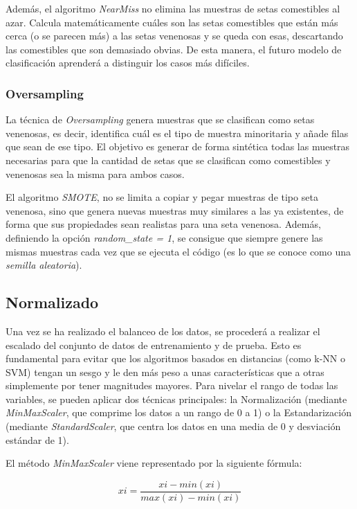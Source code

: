 \documentclass{Plantilla/Formato_EPEF}
\begin{document}
Además, el algoritmo \textit{NearMiss} no elimina las muestras de setas comestibles al azar. Calcula matemáticamente cuáles son las setas comestibles que están más cerca (o se parecen más) a las setas venenosas y se queda con esas, descartando las comestibles que son demasiado \textgravedbl obvias\textacutedbl. De esta manera, el futuro modelo de clasificación aprenderá a distinguir los casos más difíciles.



\subsubsection{Oversampling}

La técnica de \textit{Oversampling} genera muestras que se clasifican como setas venenosas, es decir, identifica cuál es el tipo de muestra minoritaria y añade filas que sean de ese tipo. El objetivo es generar de forma sintética todas las muestras necesarias para que la cantidad de setas que se clasifican como comestibles y venenosas sea la misma para ambos casos.

El algoritmo \textit{SMOTE}, no se limita a copiar y pegar muestras de tipo seta venenosa, sino que genera nuevas muestras muy similares a las ya existentes, de forma que sus propiedades sean realistas para una seta venenosa. Además, definiendo la opción \textit{random\_state = 1}, se consigue que siempre genere las mismas muestras cada vez que se ejecuta el código (es lo que se conoce como una \textit{semilla aleatoria}).


\subsection{Normalizado}
Una vez se ha realizado el balanceo de los datos, se procederá a realizar el escalado del conjunto de datos de entrenamiento y de prueba. Esto es fundamental para evitar que los algoritmos basados en distancias (como k-NN o SVM) tengan un sesgo y le den más peso a unas características que a otras simplemente por tener magnitudes mayores. Para nivelar el rango de todas las variables, se pueden aplicar dos técnicas principales: la Normalización (mediante \textit{MinMaxScaler}, que comprime los datos a un rango de 0 a 1) o la Estandarización (mediante \textit{StandardScaler}, que centra los datos en una media de 0 y desviación estándar de 1).

El método \textit{MinMaxScaler} viene representado por la siguiente fórmula:
	
\begin{equation*}
	xi=\frac{xi-min(xi)}{max(xi)-min(xi)}
\end{equation*}
	
\end{document}
